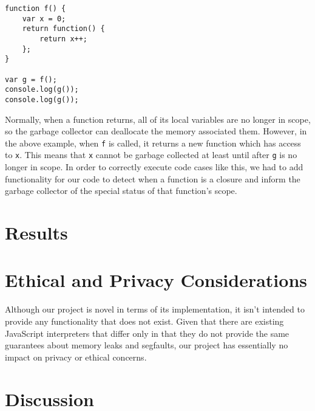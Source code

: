 \documentclass{article}
\begin{document}
\vspace{3mm}

\begin{lstlisting}
function f() {
    var x = 0;
    return function() {
        return x++;
    };
}

var g = f();
console.log(g());
console.log(g());

\end{lstlisting}

\vspace{3mm}

Normally, when a function returns, all of its local variables are no longer in
scope, so the garbage collector can deallocate the memory associated them.
However, in the above example, when \texttt{f} is called, it returns a new
function which has access to \texttt{x}. This means that \texttt{x} cannot
be garbage collected at least until after \texttt{g} is no longer in scope.
In order to correctly execute code cases like this, we had to add functionality
for our code to detect when a function is a closure and inform the garbage
collector of the special status of that function's scope.

\section*{Results}

\section*{Ethical and Privacy Considerations}

Although our project is novel in terms of its implementation, it isn't intended
to provide any functionality that does not exist. Given that there are existing
JavaScript interpreters that differ only in that they do not provide the same
guarantees about memory leaks and segfaults, our project has essentially no
impact on privacy or ethical concerns.

\section*{Discussion}
\end{document}
